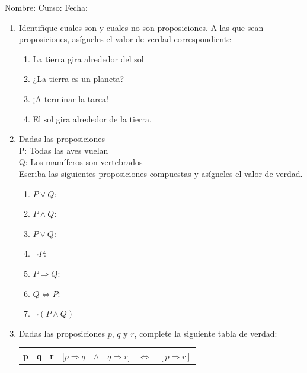 \documentclass[letterpaper,fleqn]{article}
\newcommand{\LineaNombre}{%
\par
\vspace{\baselineskip}
Nombre:\hrulefill \; Curso: \underline{\hspace*{48pt}} \; Fecha: \underline{\hspace*{2.5cm}} \relax
\par}
\begin{document}
\LineaNombre
\begin{enumerate}
 \item Identifique cuales son y cuales no son proposiciones. A las que sean proposiciones, as\'{i}gneles el valor de verdad correspondiente
 \begin{enumerate}
 \item La tierra gira alrededor del sol
 \item ¿La tierra es un planeta?
 \item ¡A terminar la tarea!
 \item El sol gira alrededor de la tierra.
 \end{enumerate}
 \item Dadas las proposiciones\\
 P: Todas las aves vuelan\\
 Q: Los mamíferos son vertebrados\\
Escriba las siguientes proposiciones compuestas y asígneles el valor de verdad.
\begin{enumerate}
\item $P\vee Q$:
\item $P\wedge Q$:
\item $P \veebar Q$:
\item $\neg P$:
\item $P\Rightarrow Q$:
\item $Q\Leftrightarrow P$:
\item $\neg (P\wedge Q)$
\end{enumerate}
\item Dadas las proposiciones $p$, $q$ y $r$, complete la siguiente tabla de verdad:
\begin{center}
\begin{tabular}{|c|c|c|c|c|c|c|c|}
\hline 
p & q & r & $[p\Rightarrow q$ & $\wedge$ & $q\Rightarrow r]$ & $\Leftrightarrow$ & $[p\Rightarrow r]$ \\ 
\hline 
 &  &  &  &  &  &  &  \\ 
\hline 
\end{tabular} 
\end{center}
 \end{enumerate}
\end{document}
